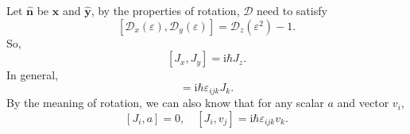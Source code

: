 \documentclass{article}
\theoremstyle{1}
\newcommand{\ii}{\mathrm{i}}
\begin{document}
Let $\hat{\mathbf{n}}$ be $\hat{\mathbf{x}}$ and $\hat{\mathbf{y}}$, by the properties of rotation, $\mathscr{D}$ need to satisfy
\begin{equation}
    \left[\mathscr{D}_x(\varepsilon),\mathscr{D}_y(\varepsilon)\right]=\mathscr{D}_z(\varepsilon^2)-1.
\end{equation}
So, 
\begin{equation}\label{13.7}
    [J_x,J_y]=\ii \hbar J_z.
\end{equation}
In general,
\begin{equation}
    [J_i,J_k]=\ii \hbar \varepsilon_{ijk}J_k.
\end{equation}
By the meaning of rotation, we can also know that for any scalar $a$ and vector $v_i$,
\begin{equation}
    \left[J_i,a\right]=0,\quad \left[J_i,v_j\right]=\ii \hbar \varepsilon_{ijk}v_k.
\end{equation}
\end{document}
